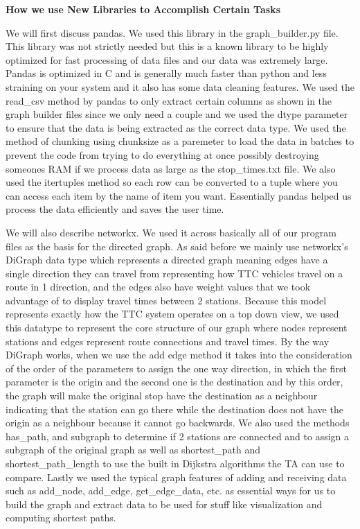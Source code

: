 \documentclass[fontsize=11pt]{article}
\begin{document}
\vspace{1em}

\textbf{How we use New Libraries to Accomplish Certain Tasks}

\vspace{1em}

We will first discuss pandas.\cite{pandas_readcsv} We used this library in the graph\_builder.py file. This library was not strictly needed but this is a known library to be highly optimized for fast processing of data files and our data was extremely large. Pandas is optimized in C and is generally much faster than python and less straining on your system and it also has some data cleaning features. We used the read\_csv method by pandas to only extract certain columns as shown in the graph builder files since we only need a couple and we used the dtype parameter to ensure that the data is being extracted as the correct data type. We used the method of chunking using chunksize as a paremeter to load the data in batches to prevent the code from trying to do everything at once possibly destroying someones RAM if we process data as large as the stop\_times.txt file. We also used the itertuples method so each row can be converted to a tuple where you can access each item by the name of item you want. Essentially pandas helped us process the data efficiently and saves the user time.

\vspace{1em}

We will also describe networkx. We used it across basically all of our program files as the basis for the directed graph. As said before we mainly use networkx's DiGraph data type\cite{networkx_digraph} which represents a directed graph meaning edges have a single direction they can travel from representing how TTC vehicles travel on a route in 1 direction, and the edges also have weight values that we took advantage of to display travel times between 2 stations. Because this model represents exactly how the TTC system operates on a top down view, we used this datatype to represent the core structure of our graph where nodes represent stations and edges represent route connections and travel times. By the way DiGraph works, when we use the add edge method it takes into the consideration of the order of the parameters to assign the one way direction, in which the first parameter is the origin and the second one is the destination and by this order, the graph will make the original stop have the destination as a neighbour indicating that the station can go there while the destination does not have the origin as a neighbour because it cannot go backwards. We also used the methods has\_path, and subgraph to determine if 2 stations are connected and to assign a subgraph of the original graph as well as shortest\_path and shortest\_path\_length to use the built in Dijkstra algorithms the TA can use to compare. Lastly we used the typical graph features of adding and receiving data such as add\_node, add\_edge, get\_edge\_data, etc. as essential ways for us to build the graph and extract data to be used for stuff like visualization and computing shortest paths.
\end{document}
